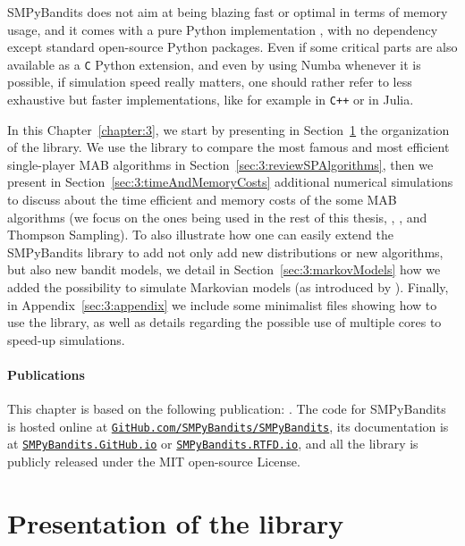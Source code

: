 SMPyBandits does not aim at being blazing fast or optimal in terms of memory usage, and it comes with a pure Python implementation \cite{python}, with no dependency except standard open-source Python packages.
Even if some critical parts are also available as a \texttt{C} Python extension, and even by using Numba \cite{numba} whenever it is possible, if simulation speed really matters, one should rather refer to less exhaustive but faster implementations, like for example \cite{TorLibbandit} in \texttt{C++} or \cite{VishMABjl} in Julia.

In this Chapter~\ref{chapter:3}, we start by presenting in Section~\ref{sec:3:presentationLibrary} the organization of the library.
We use the library to compare the most famous and most efficient single-player MAB algorithms in Section~\ref{sec:3:reviewSPAlgorithms},
then we present in Section~\ref{sec:3:timeAndMemoryCosts} additional numerical simulations to discuss about the time efficient and memory costs of the some MAB algorithms (we focus on the ones being used in the rest of this thesis, \UCB, \klUCB, and Thompson Sampling).
To also illustrate how one can easily extend the SMPyBandits library to add not only add new distributions or new algorithms, but also new bandit models, we detail in Section~\ref{sec:3:markovModels} how we added the possibility to simulate Markovian models (as introduced by \cite{Anantharam87b}).
%
Finally, in Appendix~\ref{sec:3:appendix} we include some minimalist files showing how to use the library, as well as details regarding the possible use of multiple cores to speed-up simulations.


\paragraph{Publications}
%
This chapter is based on the following publication: \cite{SMPyBanditsJMLR}.
The code for SMPyBandits is hosted online at \texttt{\href{https://GitHub.com/SMPyBandits/SMPyBandits/}{GitHub.com/SMPyBandits/SMPyBandits}}, its documentation is at \texttt{\href{https://SMPyBandits.GitHub.io/}{SMPyBandits.GitHub.io}} or \texttt{\href{https://SMPyBandits.RTFD.io/}{SMPyBandits.RTFD.io}}, and all the library is publicly released under the MIT open-source License.


\section{Presentation of the library}
\label{sec:3:presentationLibrary}


